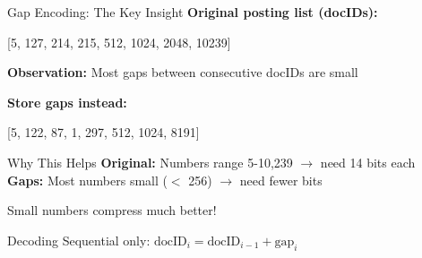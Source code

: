 \documentclass[aspectratio=169]{beamer}
\begin{document}
\begin{frame}[shrink=10]{Gap Encoding: The Key Insight}
\textbf{Original posting list (docIDs):}
\begin{center}
[5, 127, 214, 215, 512, 1024, 2048, 10239]
\end{center}

\vspace{0.5em}

\textbf{Observation:} Most gaps between consecutive docIDs are small

\vspace{0.5em}

\textbf{Store gaps instead:}
\begin{center}
[5, 122, 87, 1, 297, 512, 1024, 8191]
\end{center}

\vspace{1em}

\begin{block}{Why This Helps}
\textbf{Original:} Numbers range 5-10,239 $\rightarrow$ need 14 bits each \\
\textbf{Gaps:} Most numbers small ($<$ 256) $\rightarrow$ need fewer bits

\vspace{0.5em}

Small numbers compress much better!
\end{block}

\vspace{1em}

\begin{alertblock}{Decoding}
Sequential only: $\text{docID}_i = \text{docID}_{i-1} + \text{gap}_i$
\end{alertblock}
\end{frame}
\end{document}
